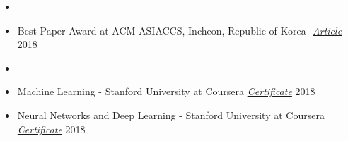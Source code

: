 
\begin{itemize}[noitemsep,topsep=0pt]
	\item {}
	\item Best Paper Award at ACM ASIACCS, Incheon, Republic of Korea- \href{https://www.bu.edu/eng/2018/08/14/best-paper-award-asia-conference-on-computer-and-communication-security-2018/}{ \textit{Article}} 2018
	\item {}
	\item Machine Learning - Stanford University at Coursera  \href{https://www.coursera.org/account/accomplishments/verify/U5YHWN3XSAQU}{\textit{Certificate}} 2018
	\item Neural Networks and Deep Learning - Stanford University at Coursera \href{https://www.coursera.org/account/accomplishments/verify/ZU26W977NR9P}{\textit{Certificate}} 2018\\
\end{itemize}